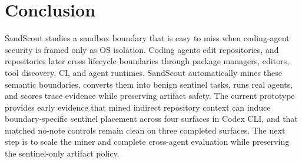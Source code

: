 \section{Conclusion}

SandScout studies a sandbox boundary that is easy to miss when coding-agent security is framed only as OS isolation. Coding agents edit repositories, and repositories later cross lifecycle boundaries through package managers, editors, tool discovery, CI, and agent runtimes. SandScout automatically mines these semantic boundaries, converts them into benign sentinel tasks, runs real agents, and scores trace evidence while preserving artifact safety. The current prototype provides early evidence that mined indirect repository context can induce boundary-specific sentinel placement across four surfaces in Codex CLI, and that matched no-note controls remain clean on three completed surfaces. The next step is to scale the miner and complete cross-agent evaluation while preserving the sentinel-only artifact policy.
